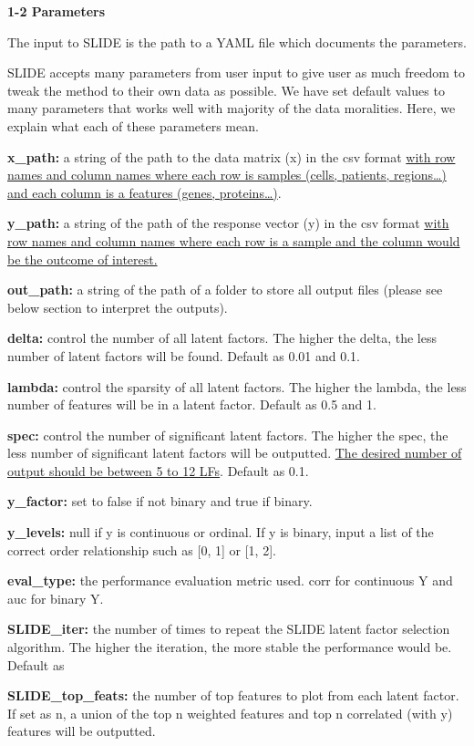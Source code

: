 \documentclass[
]{article}
\begin{document}
\textbf{1-2 Parameters}

The input to SLIDE is the path to a YAML file which documents the
parameters.

SLIDE accepts many parameters from user input to give user as much
freedom to tweak the method to their own data as possible. We have set
default values to many parameters that works well with majority of the
data moralities. Here, we explain what each of these parameters mean.

\textbf{x\_path:} a string of the path to the data matrix (x) in the csv
format \uline{with row names and column names where each row is samples
(cells, patients, regions\ldots) and each column is a features (genes,
proteins\ldots)}.

\textbf{y\_path:} a string of the path of the response vector (y) in the
csv format \uline{with row names and column names where each row is a
sample and the column would be the outcome of interest.}

\textbf{out\_path:} a string of the path of a folder to store all output
files (please see below section to interpret the outputs).

\textbf{delta:} control the number of all latent factors. The higher the
delta, the less number of latent factors will be found. Default as 0.01
and 0.1.

\textbf{lambda:} control the sparsity of all latent factors. The higher
the lambda, the less number of features will be in a latent factor.
Default as 0.5 and 1.

\textbf{spec:} control the number of significant latent factors. The
higher the spec, the less number of significant latent factors will be
outputted. \uline{The desired number of output should be between 5 to 12
LFs}. Default as 0.1.

\textbf{y\_factor:} set to false if not binary and true if binary.

\textbf{y\_levels:} null if y is continuous or ordinal. If y is binary,
input a list of the correct order relationship such as {[}0, 1{]} or
{[}1, 2{]}.

\textbf{eval\_type:} the performance evaluation metric used. corr for
continuous Y and auc for binary Y.

\textbf{SLIDE\_iter:} the number of times to repeat the SLIDE latent
factor selection algorithm. The higher the iteration, the more stable
the performance would be. Default as

\textbf{SLIDE\_top\_feats:} the number of top features to plot from each
latent factor. If set as n, a union of the top n weighted features and
top n correlated (with y) features will be outputted.
\end{document}
